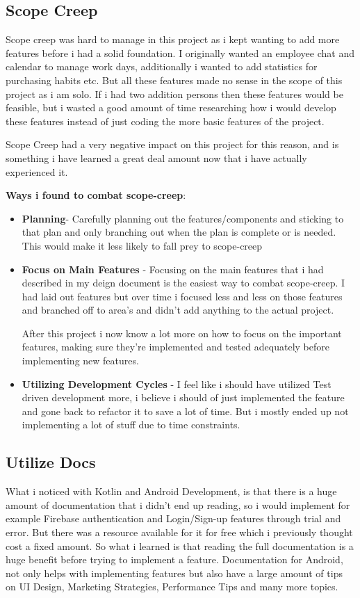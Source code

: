 \subsection{Scope Creep}
Scope creep was hard to manage in this project as i kept wanting to add more features before i had a solid foundation. I originally wanted an employee chat and calendar to manage work days, additionally i wanted to add statistics for purchasing habits etc. But all these features made no sense in the scope of this project as i am solo. If i had two addition persons then these features would be feasible, but i wasted a good amount of time researching how i would develop these features instead of just coding the more basic features of the project.

Scope Creep had a very negative impact on this project for this reason, and is something i have learned a great deal amount now that i have actually experienced it.\newline

\textbf{Ways i found to combat scope-creep}:
\begin{itemize}
    \item \textbf{Planning}- Carefully planning out the features/components and sticking to that plan and only branching out when the plan is complete or is needed. This would make it less likely to fall prey to scope-creep
    \item \textbf{Focus on Main Features} - Focusing on the main features that i had described in my deign document is the easiest way to combat scope-creep. I had laid out features but over time i focused less and less on those features and branched off to area's and didn't add anything to the actual project.
    
    After this project i now know a lot more on how to focus on the important features, making sure they're implemented and tested adequately before implementing new features.
    \item \textbf{Utilizing Development Cycles} - I feel like i should have utilized Test driven development more, i believe i should of just implemented the feature and gone back to refactor it to save a lot of time. But i mostly ended up not implementing a lot of stuff due to time constraints.
\end{itemize}

\subsection{Utilize Docs}
What i noticed with Kotlin and Android Development, is that there is a huge amount of documentation that i didn't end up reading, so i would implement for example Firebase authentication and Login/Sign-up features through trial and error. But there was a resource available for it for free which i previously thought cost a fixed amount.
So what i learned is that reading the full documentation is a huge benefit before trying to implement a feature.
Documentation for Android, not only helps with implementing features but also have a large amount of tips on UI Design, Marketing Strategies, Performance Tips and many more topics. 


